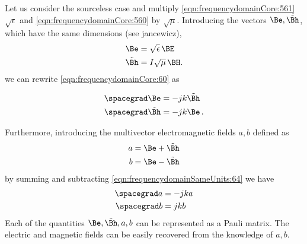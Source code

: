
Let us consider the sourceless case
and multiply
\cref{eqn:frequencydomainCore:561}
$\sqrt{\epsilon}$ and 
\cref{eqn:frequencydomainCore:560}
by  $\sqrt{\mu}$. Introducing the vectors
$\Be, \tilde{\Bh}$,
which have the same dimensions (see jancewicz),
%
\begin{equation}\label{eqn:frequencydomainSameUnits:62}
\begin{aligned}
 \Be     &=  \sqrt{\epsilon} \, \BE\\
\tilde{\Bh} &= I \sqrt{\mu}\,  \BH.
\end{aligned}
\end{equation}
%
we can rewrite \cref{eqn:frequencydomainCore:60} as

\begin{equation}\label{eqn:frequencydomainSameUnits:64}
\begin{aligned}
\spacegrad \Be     &= -j k \tilde{\Bh} \\
\spacegrad \tilde{\Bh} &=  - j k \Be \, .
\end{aligned}
\end{equation}

Furthermore, introducing the multivector electromagnetic fields $a, b$ defined as
%
\begin{equation}\label{eqn:frequencydomainSameUnits:66}
\begin{aligned}
a &= \Be + \tilde{\Bh} \\
b &= \Be - \tilde{\Bh}
\end{aligned}
\end{equation}
%
by summing and subtracting \cref{eqn:frequencydomainSameUnits:64} we have
%
\begin{equation}\label{eqn:frequencydomainSameUnits:68}
\begin{aligned}
\spacegrad a &= - j k a \\
\spacegrad b &=  j k b
\end{aligned}
\end{equation}
%
Each of the quantities $\Be, \tilde{\Bh}, a, b$ can be represented as a Pauli matrix. The electric and magnetic fields can be easily recovered from the knowledge of $a, b$.

